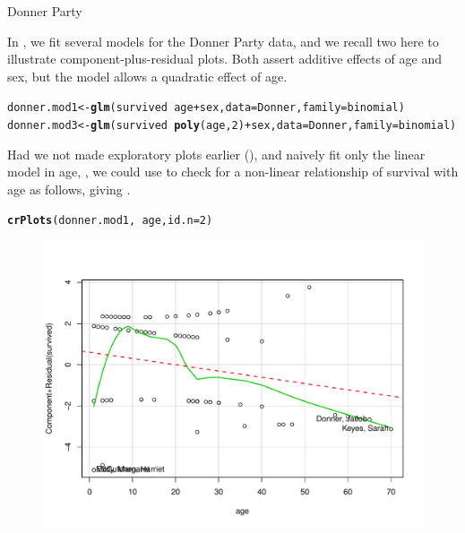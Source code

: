 \documentclass[11pt]{book}\usepackage[]{graphicx}\usepackage[]{color}
\makeatletter
\newcommand{\hlnum}[1]{\textcolor[rgb]{0.686,0.059,0.569}{#1}}%
\newcommand{\hlopt}[1]{\textcolor[rgb]{0,0,0}{#1}}%
\newcommand{\hlstd}[1]{\textcolor[rgb]{0.345,0.345,0.345}{#1}}%
\newcommand{\hlkwb}[1]{\textcolor[rgb]{0.69,0.353,0.396}{#1}}%
\newcommand{\hlkwc}[1]{\textcolor[rgb]{0.333,0.667,0.333}{#1}}%
\newcommand{\hlkwd}[1]{\textcolor[rgb]{0.737,0.353,0.396}{\textbf{#1}}}%
\newenvironment{kframe}{%
 \def\at@end@of@kframe{}%
 \ifinner\ifhmode%
  \def\at@end@of@kframe{\end{minipage}}%
  \begin{minipage}{\columnwidth}%
 \fi\fi%
 \def\FrameCommand##1{\hskip\@totalleftmargin \hskip-\fboxsep
 \colorbox{shadecolor}{##1}\hskip-\fboxsep
     \hskip-\linewidth \hskip-\@totalleftmargin \hskip\columnwidth}%
 \MakeFramed {\advance\hsize-\width
   \@totalleftmargin\z@ \linewidth\hsize
   \@setminipage}}%
 {\par\unskip\endMakeFramed%
 \at@end@of@kframe}
\newenvironment{knitrout}{}{} %
\renewenvironment{knitrout}{\small\renewcommand{\baselinestretch}{.85}}{} %
\makeatother
\begin{document}
\begin{Example}[donner3]{Donner Party}

In , we fit several models for the Donner Party
data, and we recall two here to illustrate component-plus-residual
plots.  Both assert additive effects of age and sex, but the model
 allows a quadratic effect of age.

\begin{knitrout}
\color{fgcolor}\begin{kframe}
\begin{alltt}
\hlstd{donner.mod1} \hlkwb{<-} \hlkwd{glm}\hlstd{(survived} \hlopt{~} \hlstd{age} \hlopt{+} \hlstd{sex,} \hlkwc{data}\hlstd{=Donner,} \hlkwc{family}\hlstd{=binomial)}
\hlstd{donner.mod3} \hlkwb{<-} \hlkwd{glm}\hlstd{(survived} \hlopt{~} \hlkwd{poly}\hlstd{(age,}\hlnum{2}\hlstd{)} \hlopt{+} \hlstd{sex,} \hlkwc{data}\hlstd{=Donner,} \hlkwc{family}\hlstd{=binomial)}
\end{alltt}
\end{kframe}
\end{knitrout}
Had we not made exploratory plots earlier (), and naively
fit only the linear model in age, , we could use  to
check for a non-linear relationship of survival with age as follows, giving .

\begin{knitrout}
\color{fgcolor}\begin{kframe}
\begin{alltt}
\hlkwd{crPlots}\hlstd{(donner.mod1,} \hlopt{~}\hlstd{age,} \hlkwc{id.n}\hlstd{=}\hlnum{2}\hlstd{)}
\end{alltt}
\end{kframe}\begin{figure}[!htbp]


\centerline{\includegraphics[width=.6\textwidth]{ch07/fig/donner-cr1-1} }


\end{figure}
\end{knitrout}
\end{Example}
\end{document}
